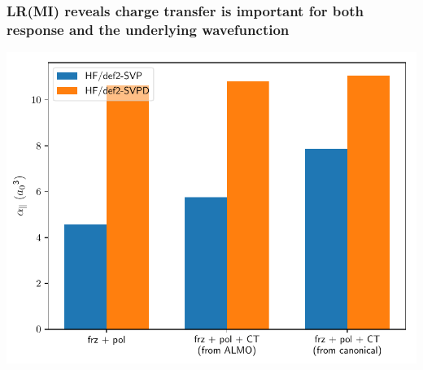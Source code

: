 \documentclass[%
    xcolor=usenames,dvipsnames,svgnames%
]{beamer}
\newenvironment{nscenter}
 {\parskip=0pt\par\nopagebreak\centering}
 {\par\noindent\ignorespacesafterend}
\begin{document}
\begin{frame}
  \frametitle{LR(MI) reveals charge transfer is important for both response and the underlying wavefunction}
  \begin{nscenter}
    \includegraphics[scale=0.70]{./figures/bar_mechanisms_combined.pdf}
  \end{nscenter}
\end{frame}
\end{document}
